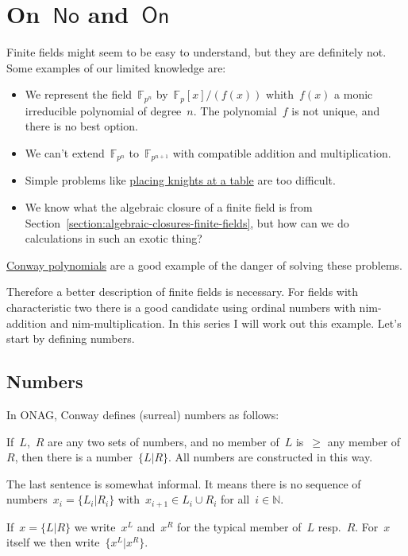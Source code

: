 \section{On~$\mathsf{No}$ and~$\mathsf{On}$}
Finite fields might seem to be easy to understand, but they are definitely not. Some examples of our limited knowledge are:
\begin{itemize}
  \item We represent the field~$\mathbb{F}_{p^n}$ by~$\mathbb{F}_p[x]/(f(x))$ whith~$f(x)$ a monic irreducible polynomial of degree~$n$. The polynomial~$f$ is not unique, and there is no best option.
  \item We can't extend~$\mathbb{F}_{p^n}$ to~$\mathbb{F}_{p^{n+1}}$ with compatible addition and multiplication.
  \item Simple problems like \href{http://www.neverendingbooks.org/index.php/the-odd-knights-of-the-round-table.html}{placing knights at a table} are too difficult.
  \item We know what the algebraic closure of a finite field is from Section~\ref{section:algebraic-closures-finite-fields}, but how can we do calculations in such an exotic thing?
\end{itemize}
\href{http://en.wikipedia.org/wiki/Conway_polynomial_\%28finite_fields\%29}{Conway polynomials} are a good example of the danger of solving these problems.

Therefore a better description of finite fields is necessary. For fields with characteristic two there is a good candidate using ordinal numbers with nim-addition and nim-multiplication. In this series I will work out this example. Let's start by defining numbers.

\subsection{Numbers}
In ONAG, Conway defines (surreal) numbers as follows:

\begin{definition}
  If~$L$,~$R$ are any two sets of numbers, and no member of~$L$ is~$\geq$ any member of~$R$, then there is a number~$\{L \vert R\}$. All numbers are constructed in this way.
\end{definition}

The last sentence is somewhat informal. It means there is no sequence of numbers~$x_i = \{L_i \vert R_i\}$ with~$x_{i+1} \in L_i \cup R_i$ for all~$i \in \mathbb{N}$.

\begin{notation}
  If~$x = \{L \vert R\}$ we write~$x^L$ and~$x^R$ for the typical member of~$L$ resp.~$R$. For~$x$ itself we then write~$\{x^L \vert x^R\}$.
\end{notation}


